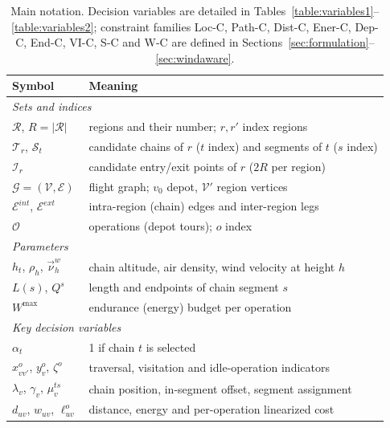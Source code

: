 \begin{table}[t]
\centering
\caption{Main notation. Decision variables are detailed in Tables~\ref{table:variables1}--\ref{table:variables2}; constraint families Loc-C, Path-C, Dist-C, Ener-C, Dep-C, End-C, VI-C, S-C and W-C are defined in Sections~\ref{sec:formulation}--\ref{sec:windaware}.}
\label{tab:notation}
\begin{tabular}{ll}
\toprule
Symbol & Meaning \\
\midrule
\multicolumn{2}{l}{\textit{Sets and indices}} \\
$\mathcal R$, $R=|\mathcal R|$ & regions and their number; $r,r'$ index regions \\
$\mathcal T_r$, $\mathcal S_t$ & candidate chains of $r$ ($t$ index) and segments of $t$ ($s$ index) \\
$\mathcal I_r$ & candidate entry/exit points of $r$ ($2R$ per region) \\
$\mathcal G=(\mathcal V,\mathcal E)$ & flight graph; $v_0$ depot, $\mathcal V'$ region vertices \\
$\mathcal E^{int}$, $\mathcal E^{ext}$ & intra-region (chain) edges and inter-region legs \\
$\mathcal O$ & operations (depot tours); $o$ index \\
\multicolumn{2}{l}{\textit{Parameters}} \\
$h_t$, $\rho_h$, $\vec\nu_h^w$ & chain altitude, air density, wind velocity at height $h$ \\
$L(s)$, $Q^s$ & length and endpoints of chain segment $s$ \\
$W^{\max}$ & endurance (energy) budget per operation \\
\multicolumn{2}{l}{\textit{Key decision variables}} \\
$\alpha_t$ & 1 if chain $t$ is selected \\
$x_{vv'}^o$, $y_v^o$, $\zeta^o$ & traversal, visitation and idle-operation indicators \\
$\lambda_v$, $\gamma_v$, $\mu_v^{ts}$ & chain position, in-segment offset, segment assignment \\
$d_{uv}$, $w_{uv}$, $\ell_{uv}^o$ & distance, energy and per-operation linearized cost \\
\bottomrule
\end{tabular}
\end{table}
